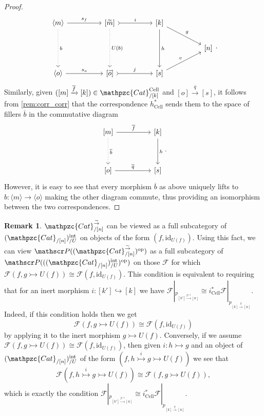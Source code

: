 \documentclass[a4paper, reqno]{amsart}
\theoremstyle{definition}
\newtheorem{remark}[theorem]{Remark}
\newcommand\cF{\mathscr F}
\newcommand\cP{\mathscr P}
\newcommand\id{\mathrm{id}}
\newcommand\op{\mathrm{op}}
\newcommand\ccat{\mathpzc{Cat}}
\newcommand\cell{\mathrm{Cell}}
\newcommand\bm{\langle m\rangle}
\newcommand\wrr{{\overset{\sim}{\rightarrow}}}
\newcommand\inrt{\mathrm{int}}
\begin{document}
\begin{proof}
\[
\begin{tikzcd}[column sep=huge]
\bm\arrow[r, "s_f"]\arrow[dd, dotted, "b"]&{[\widetilde{m}]}\arrow[r, tail, "i"]\arrow[dd, dotted, "U(b)"]&{[k]}\arrow[dd,  "h"]\arrow[dr, "g"]\\
{}&{}&{}&{[n]}\\
\langle o\rangle\arrow[r, "s_o"]&{[\widetilde{o}]}\arrow[r, tail, "j"]&{[s]}\arrow[ur, "v"]
\end{tikzcd}.
\]
Similarly, given $([m]\xrightarrow{\overline{f}}[k])\in\ccat^\cell_{/[k]}$ and $[o]\xrightarrow{\overline{q}}[s]$, it follows from \cref{rem:corr_corr} that the correspondence $h_\cell^*$ sends them to the space of fillers $\overline{b}$ in the commutative diagram
\[
\begin{tikzcd}[row sep=huge, column sep=huge]
{[m]}\arrow[d, dotted, "\overline{b}"]\arrow[r, "\overline{f}"]&{[k]}\arrow[d, "h"]\\
{[o]}\arrow[r, "\overline{q}"]&{[s]}
\end{tikzcd}.
\]
However, it is easy to see that every morphism $\overline{b}$ as above uniquely lifts to $b:\bm\rightarrow\langle o\rangle$ making the other diagram commute, thus providing an isomorphism between the two correspondences.
\end{proof}
\begin{remark}\label{rem:lax_fun}
$\ccat^\wrr_{/[n]}$ can be viewed as a full subcategory of $(\ccat_{/[n]})^\inrt_{/U}$ on objects of the form $(f,\id_{U(f)})$. Using this fact, we can view $\cP((\ccat^\wrr_{/[n]})^\op)$ as a full subcategory of $\cP(((\ccat_{/[n]})^\inrt_{/U})^\op)$ on those $\cF$ for which $\cF(f,g\rightarrowtail U(f))\cong\cF(f,\id_{U(f)})$. This condition is equivalent to requiring that for an inert morphism $i:[k']\hookrightarrow[k]$ we have $\cF|_{p_{[k']\xrightarrow{g\circ i}[n]}}\cong i^*_\cell\cF|_{p_{[k]\xrightarrow{g}[n]}}$. Indeed, if this condition holds then we get \[\cF(f,g\rightarrowtail U(f))\cong\cF(f,\id_{U(f)})\]
by applying it to the inert morphism $g\rightarrowtail U(f)$. Conversely, if we assume $\cF(f,g\rightarrowtail U(f))\cong\cF(f,\id_{U(f)})$, then given $i:h\rightarrowtail g$ and an object of $(\ccat_{/[n]})^\inrt_{/U}$ of the form $(f, h\overset{i}{\rightarrowtail}g\rightarrowtail U(f))$ we see that 
\[\cF(f, h\overset{i}{\rightarrowtail}g\rightarrowtail U(f))\cong \cF(f, g\rightarrowtail U(f)),\] 
which is exactly the condition $\cF|_{p_{[k']\xrightarrow{g\circ i}[n]}}\cong i^*_\cell\cF|_{p_{[k]\xrightarrow{g}[n]}}$.
\end{remark}
\end{document}
